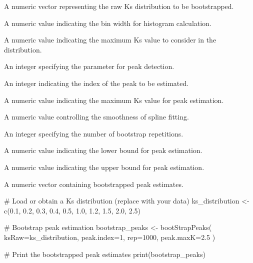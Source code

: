 \documentclass[a4paper]{book}
\begin{document}
\begin{Arguments}
\begin{ldescription}
\item[\code{ksRaw}] A numeric vector representing the raw Ks distribution to be bootstrapped.

\item[\code{binWidth}] A numeric value indicating the bin width for histogram calculation.

\item[\code{maxK}] A numeric value indicating the maximum Ks value to consider in the distribution.

\item[\code{m}] An integer specifying the parameter for peak detection.

\item[\code{peak.index}] An integer indicating the index of the peak to be estimated.

\item[\code{peak.maxK}] A numeric value indicating the maximum Ks value for peak estimation.

\item[\code{spar}] A numeric value controlling the smoothness of spline fitting.

\item[\code{rep}] An integer specifying the number of bootstrap repetitions.

\item[\code{from}] A numeric value indicating the lower bound for peak estimation.

\item[\code{to}] A numeric value indicating the upper bound for peak estimation.
\end{ldescription}
\end{Arguments}
%
\begin{Value}
A numeric vector containing bootstrapped peak estimates.
\end{Value}
%
\begin{Examples}
\begin{ExampleCode}
# Load or obtain a Ks distribution (replace with your data)
ks_distribution <- c(0.1, 0.2, 0.3, 0.4, 0.5, 1.0, 1.2, 1.5, 2.0, 2.5)

# Bootstrap peak estimation
bootstrap_peaks <- bootStrapPeaks(
    ksRaw=ks_distribution,
    peak.index=1,
    rep=1000,
    peak.maxK=2.5
)

# Print the bootstrapped peak estimates
print(bootstrap_peaks)
\end{ExampleCode}
\end{Examples}
\end{document}
